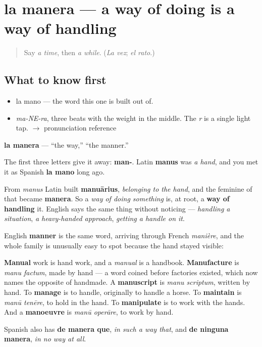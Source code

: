 \section[la manera]{la manera — a way of doing is a way of handling}

\label{lesson:ES-C331-manera}



\begin{quote}
Say \emph{a time}, then \emph{a while}. (\emph{La vez}; \emph{el rato}.)
\end{quote}

\subsection*{What to know first}
\begin{itemize}
\raggedright
  \item la mano — the word this one is built out of.
\end{itemize}

\begin{sounds}
\begin{itemize}
\raggedright
  \item \emph{ma-NE-ra}, three beats with the weight in the middle. The \emph{r} is a single light tap. $\to$ pronunciation reference
\end{itemize}
\end{sounds}

\begin{cousinweb}
\textbf{la manera} — \textquotedblleft{}the way,\textquotedblright{} \textquotedblleft{}the manner.\textquotedblright{}

The first three letters give it away: \textbf{man-}. Latin \textbf{manus} was \emph{a hand}, and you met it as Spanish \textbf{la mano} long ago.

From \emph{manus} Latin built \textbf{manuārius}, \emph{belonging to the hand}, and the feminine of that became \textbf{manera}. So a \emph{way of doing something} is, at root, a \textbf{way of handling} it. English says the same thing without noticing — \emph{handling a situation}, \emph{a heavy-handed approach}, \emph{getting a handle on it}.

English \textbf{manner} is the same word, arriving through French \emph{manière}, and the whole family is unusually easy to spot because the hand stayed visible:

\textbf{Manual} work is hand work, and a \emph{manual} is a handbook. \textbf{Manufacture} is \emph{manu factum}, made by hand — a word coined before factories existed, which now names the opposite of handmade. A \textbf{manuscript} is \emph{manu scriptum}, written by hand. To \textbf{manage} is to handle, originally to handle a horse. To \textbf{maintain} is \emph{manū tenēre}, to hold in the hand. To \textbf{manipulate} is to work with the hands. And a \textbf{manoeuvre} is \emph{manū operāre}, to work by hand.

Spanish also has \textbf{de manera que}, \emph{in such a way that}, and \textbf{de ninguna manera}, \emph{in no way at all}.
\end{cousinweb}

